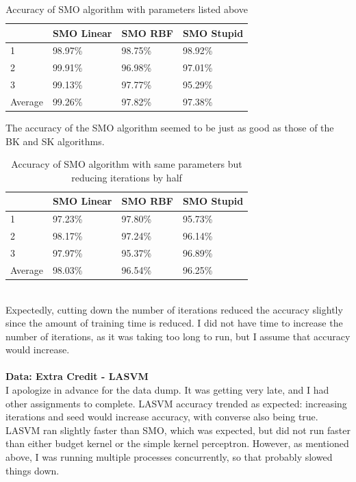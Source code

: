 \documentclass[submit]{harvardml}
\begin{document}
\begin{table}[hbt]
\centering
\caption{Accuracy of SMO algorithm with parameters listed above}
\label{my-label}
\begin{tabular}{l|lll}
        & SMO Linear & SMO RBF & SMO Stupid \\ \hline
1       & 98.97\%    & 98.75\% & 98.92\%    \\
2       & 99.91\%    & 96.98\% & 97.01\%    \\
3       & 99.13\%    & 97.77\% & 95.29\%    \\ \hline
Average & 99.26\%    & 97.82\% & 97.38\%   
\end{tabular}
\end{table} 
\noindent The accuracy of the SMO algorithm seemed to be just as good as those of the BK and SK algorithms.  \\
\begin{table}[hbt]
\centering
\caption{Accuracy of SMO algorithm with same parameters but reducing iterations by half}
\label{my-label}
\begin{tabular}{l|lll}
        & SMO Linear & SMO RBF & SMO Stupid \\ \hline
1       & 97.23\%    & 97.80\% & 95.73\%    \\
2       & 98.17\%    & 97.24\% & 96.14\%    \\
3       & 97.97\%    & 95.37\% & 96.89\%    \\ \hline
Average & 98.03\%    & 96.54\% & 96.25\%   
\end{tabular}
\end{table}\\
\noindent Expectedly, cutting down the number of iterations reduced the accuracy slightly since the amount of training time is reduced. I did not have time to increase the number of iterations, as it was taking too long to run, but I assume that accuracy would increase. \\ \\
\textbf{Data: Extra Credit - LASVM} \\ 
I apologize in advance for the data dump. It was getting very late, and I had other assignments to complete. LASVM accuracy trended as expected: increasing iterations and seed would increase accuracy, with converse also being true. LASVM ran slightly faster than SMO, which was expected, but did not run faster than either budget kernel or the simple kernel perceptron. However, as mentioned above, I was running multiple processes concurrently, so that probably slowed things down.  \\ \\
\end{document}
